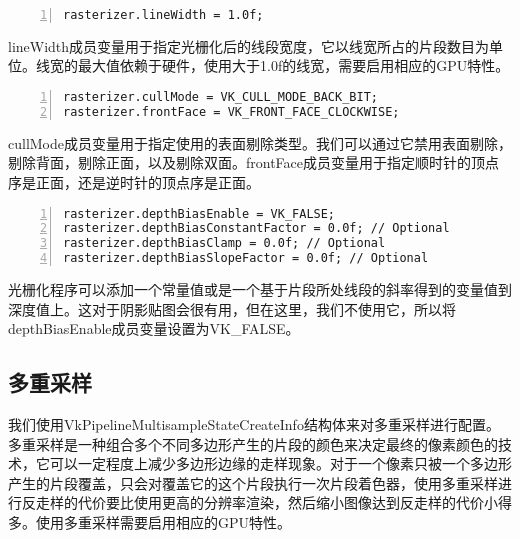 \documentclass{ctexart}
\begin{document}
\begin{lstlisting}[language={[ANSI]C},keywordstyle=\color{blue!70},commentstyle=\color{red!50!green!50!blue!50},frame=shadowbox, rulesepcolor=\color{red!20!green!20!blue!20},basicstyle=\small,numbers=left, numberstyle=\tiny,breaklines=true]
rasterizer.lineWidth = 1.0f;
\end{lstlisting}

lineWidth成员变量用于指定光栅化后的线段宽度，它以线宽所占的片段数目为单位。线宽的最大值依赖于硬件，使用大于1.0f的线宽，需要启用相应的GPU特性。

\begin{lstlisting}[language={[ANSI]C},keywordstyle=\color{blue!70},commentstyle=\color{red!50!green!50!blue!50},frame=shadowbox, rulesepcolor=\color{red!20!green!20!blue!20},basicstyle=\small,numbers=left, numberstyle=\tiny,breaklines=true]
rasterizer.cullMode = VK_CULL_MODE_BACK_BIT;
rasterizer.frontFace = VK_FRONT_FACE_CLOCKWISE;
\end{lstlisting}

cullMode成员变量用于指定使用的表面剔除类型。我们可以通过它禁用表面剔除，剔除背面，剔除正面，以及剔除双面。frontFace成员变量用于指定顺时针的顶点序是正面，还是逆时针的顶点序是正面。

\begin{lstlisting}[language={[ANSI]C},keywordstyle=\color{blue!70},commentstyle=\color{red!50!green!50!blue!50},frame=shadowbox, rulesepcolor=\color{red!20!green!20!blue!20},basicstyle=\small,numbers=left, numberstyle=\tiny,breaklines=true]
rasterizer.depthBiasEnable = VK_FALSE;
rasterizer.depthBiasConstantFactor = 0.0f; // Optional
rasterizer.depthBiasClamp = 0.0f; // Optional
rasterizer.depthBiasSlopeFactor = 0.0f; // Optional
\end{lstlisting}

光栅化程序可以添加一个常量值或是一个基于片段所处线段的斜率得到的变量值到深度值上。这对于阴影贴图会很有用，但在这里，我们不使用它，所以将depthBiasEnable成员变量设置为VK\_FALSE。

\subsection{多重采样}

我们使用VkPipelineMultisampleStateCreateInfo结构体来对多重采样进行配置。多重采样是一种组合多个不同多边形产生的片段的颜色来决定最终的像素颜色的技术，它可以一定程度上减少多边形边缘的走样现象。对于一个像素只被一个多边形产生的片段覆盖，只会对覆盖它的这个片段执行一次片段着色器，使用多重采样进行反走样的代价要比使用更高的分辨率渲染，然后缩小图像达到反走样的代价小得多。使用多重采样需要启用相应的GPU特性。
\end{document}
